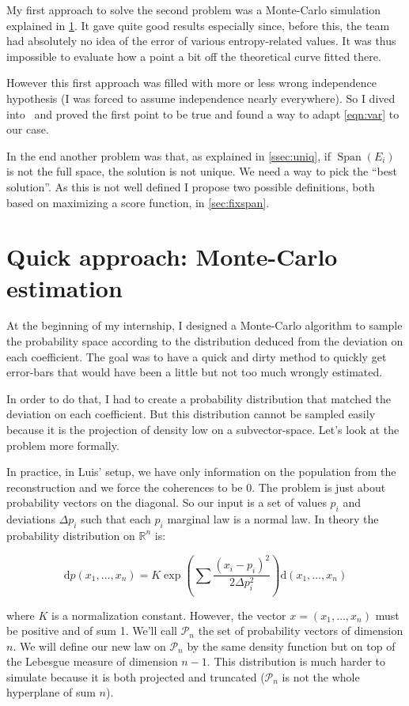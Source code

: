 \documentclass[10pt,a4paper]{report}
\theoremstyle{plain}
\theoremstyle{definition}
\theoremstyle{remark}
\newcommand{\R}{\ensuremath{\mathbb{R}}}
\newcommand{\dd}{\mathrm{d}}
\DeclareMathOperator{\Span}{Span}
\begin{document}
My first approach to solve the second problem was a Monte-Carlo simulation
explained in \cref{sec:MC}. It gave quite good results especially since,
before this, the team had absolutely no idea of the error of various
entropy-related values. It was thus impossible to evaluate how a point a
bit off the theoretical curve fitted there.

However this first approach was filled with more or less wrong independence
hypothesis (I was forced to assume independence nearly everywhere). So I dived
into~\cite{SPRAL17} and proved the first point to be true and found a way to
adapt \cref{eqn:var} to our case.

In the end another problem was that, as explained in \cref{ssec:uniq}, if
$\Span(E_i)$ is not the full space, the solution is not unique. We need a way to
pick the ``best solution''. As this is not well defined I propose two possible
definitions, both based on maximizing a score function, in \cref{sec:fixspan}.

\section{Quick approach: Monte-Carlo estimation}\label{sec:MC}

At the beginning of my internship, I designed a Monte-Carlo algorithm to sample
the probability space according to the distribution deduced from the deviation on
each coefficient. The goal was to have a quick and dirty method to quickly get
error-bars that would have been a little but not too much wrongly estimated.

In order to do that, I had to create a probability distribution that matched the
deviation on each coefficient. But this distribution
cannot be sampled easily because it is the projection of density low on a
subvector-space. Let's look at the problem more formally.

In practice, in Luis' setup, we have only information on the
population from the reconstruction and we force the coherences to be 0.
The problem is just about probability vectors on the diagonal.
So our input is a set of values
$p_i$ and deviations $\Delta p_i$ such that each $p_i$ marginal law is a normal
law. In theory the probability distribution on $\R^n$ is:

\[\dd p(x_1,\ldots,x_n) = K \exp\left(\sum \frac{(x_i - p_i)^2}{2\Delta p_i^2}
  \right) \dd(x_1,\ldots,x_n)\]

where $K$ is a normalization constant. However, the vector $x =(x_1,\ldots,x_n)$
must be positive and of sum 1. We'll call $\mathcal{P}_n$ the set of probability
vectors of dimension $n$. We will define our new law on $\mathcal{P}_n$ by the
same density function but on top of the Lebesgue measure of dimension $n-1$.
This distribution is much harder to simulate because it is both projected and
truncated ($\mathcal{P}_n$ is not the whole hyperplane of sum $n$).
\end{document}

